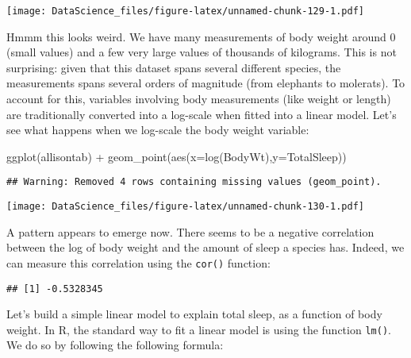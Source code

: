 \documentclass[
]{book}
\newenvironment{Shaded}{\begin{snugshade}}{\end{snugshade}}
\newcommand{\AttributeTok}[1]{\textcolor[rgb]{0.77,0.63,0.00}{#1}}
\newcommand{\FunctionTok}[1]{\textcolor[rgb]{0.00,0.00,0.00}{#1}}
\newcommand{\NormalTok}[1]{#1}
\newcommand{\SpecialCharTok}[1]{\textcolor[rgb]{0.00,0.00,0.00}{#1}}
\newcommand{\StringTok}[1]{\textcolor[rgb]{0.31,0.60,0.02}{#1}}
\begin{document}
\texttt{[image: DataScience\_files/figure-latex/unnamed-chunk-129-1.pdf]}

Hmmm this looks weird. We have many measurements of body weight around 0 (small values) and a few very large values of thousands of kilograms. This is not surprising: given that this dataset spans several different species, the measurements spans several orders of magnitude (from elephants to molerats). To account for this, variables involving body measurements (like weight or length) are traditionally converted into a log-scale when fitted into a linear model. Let's see what happens when we log-scale the body weight variable:

\begin{Shaded}
\begin{Highlighting}[]
\FunctionTok{ggplot}\NormalTok{(allisontab) }\SpecialCharTok{+} \FunctionTok{geom\_point}\NormalTok{(}\FunctionTok{aes}\NormalTok{(}\AttributeTok{x=}\FunctionTok{log}\NormalTok{(BodyWt),}\AttributeTok{y=}\NormalTok{TotalSleep))}
\end{Highlighting}
\end{Shaded}

\begin{verbatim}
## Warning: Removed 4 rows containing missing values (geom_point).
\end{verbatim}

\texttt{[image: DataScience\_files/figure-latex/unnamed-chunk-130-1.pdf]}

A pattern appears to emerge now. There seems to be a negative correlation between the log of body weight and the amount of sleep a species has. Indeed, we can measure this correlation using the \texttt{cor()} function:

\begin{Shaded}
\end{Shaded}

\begin{verbatim}
## [1] -0.5328345
\end{verbatim}

Let's build a simple linear model to explain total sleep, as a function of body weight. In R, the standard way to fit a linear model is using the function \texttt{lm()}. We do so by following the following formula:
\end{document}
